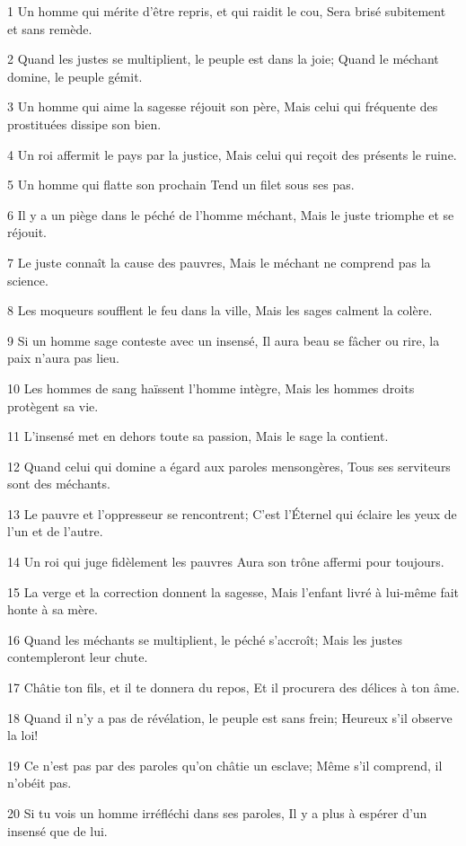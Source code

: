 \par 1 Un homme qui mérite d'être repris, et qui raidit le cou, Sera brisé subitement et sans remède.
\par 2 Quand les justes se multiplient, le peuple est dans la joie; Quand le méchant domine, le peuple gémit.
\par 3 Un homme qui aime la sagesse réjouit son père, Mais celui qui fréquente des prostituées dissipe son bien.
\par 4 Un roi affermit le pays par la justice, Mais celui qui reçoit des présents le ruine.
\par 5 Un homme qui flatte son prochain Tend un filet sous ses pas.
\par 6 Il y a un piège dans le péché de l'homme méchant, Mais le juste triomphe et se réjouit.
\par 7 Le juste connaît la cause des pauvres, Mais le méchant ne comprend pas la science.
\par 8 Les moqueurs soufflent le feu dans la ville, Mais les sages calment la colère.
\par 9 Si un homme sage conteste avec un insensé, Il aura beau se fâcher ou rire, la paix n'aura pas lieu.
\par 10 Les hommes de sang haïssent l'homme intègre, Mais les hommes droits protègent sa vie.
\par 11 L'insensé met en dehors toute sa passion, Mais le sage la contient.
\par 12 Quand celui qui domine a égard aux paroles mensongères, Tous ses serviteurs sont des méchants.
\par 13 Le pauvre et l'oppresseur se rencontrent; C'est l'Éternel qui éclaire les yeux de l'un et de l'autre.
\par 14 Un roi qui juge fidèlement les pauvres Aura son trône affermi pour toujours.
\par 15 La verge et la correction donnent la sagesse, Mais l'enfant livré à lui-même fait honte à sa mère.
\par 16 Quand les méchants se multiplient, le péché s'accroît; Mais les justes contempleront leur chute.
\par 17 Châtie ton fils, et il te donnera du repos, Et il procurera des délices à ton âme.
\par 18 Quand il n'y a pas de révélation, le peuple est sans frein; Heureux s'il observe la loi!
\par 19 Ce n'est pas par des paroles qu'on châtie un esclave; Même s'il comprend, il n'obéit pas.
\par 20 Si tu vois un homme irréfléchi dans ses paroles, Il y a plus à espérer d'un insensé que de lui.
